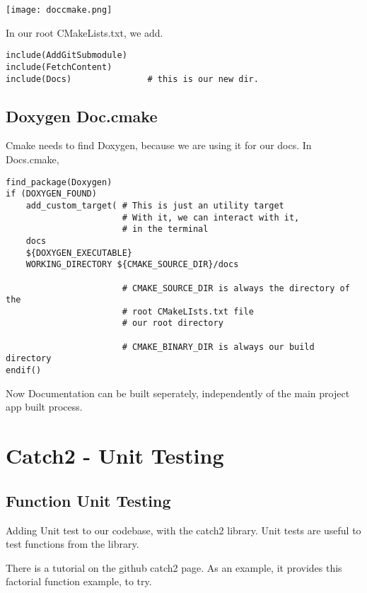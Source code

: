 \begin{center}
    \texttt{[image: doccmake.png]}
\end{center}

In our root CMakeLists.txt, we add.

\begin{verbatim}
include(AddGitSubmodule)
include(FetchContent)
include(Docs)               # this is our new dir.

\end{verbatim}


\subsection{Doxygen Doc.cmake}

Cmake needs to find Doxygen, because we are using it for our docs. In Docs.cmake,

\begin{verbatim}
find_package(Doxygen)
if (DOXYGEN_FOUND)
    add_custom_target( # This is just an utility target
                       # With it, we can interact with it, 
                       # in the terminal
    docs
    ${DOXYGEN_EXECUTABLE}
    WORKING_DIRECTORY ${CMAKE_SOURCE_DIR}/docs

                       # CMAKE_SOURCE_DIR is always the directory of the
                       # root CMakeLIsts.txt file
                       # our root directory

                       # CMAKE_BINARY_DIR is always our build directory
endif()
\end{verbatim}

Now Documentation can be built seperately, independently of the main project app built process.

\section{Catch2 - Unit Testing}

\subsection{Function Unit Testing}

Adding Unit test to our codebase, with the catch2 library. Unit tests are useful to test functions from the library.

There is a tutorial on the github catch2 page. As an example, it provides this factorial function example, to try.

